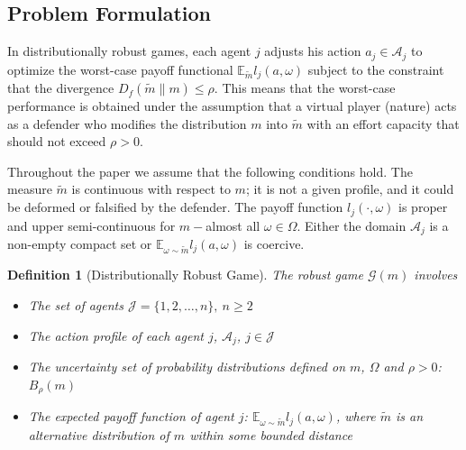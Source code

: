\documentclass{article}
\newtheorem{defi}{Definition}
\begin{document}
\subsection{Problem Formulation}
In distributionally robust games, each agent $j$ adjusts his action $a_j\in \mathcal{A}_j$ to optimize the worst-case payoff functional $\mathbb{E}_{\tilde{m}} l_j(a,\omega)$ subject to the constraint that the divergence $D_f(\tilde{m}\parallel m )\leq \rho$. This means that the worst-case performance is obtained under the assumption that a virtual player (nature) acts as a defender who modifies the distribution $m$ into $\tilde{m}$ with an effort capacity that should not exceed $\rho>0$. 

Throughout the paper we assume that the following conditions hold. The measure $\tilde{m}$ is continuous with respect to $m$; it is not a given profile, and it could be deformed or falsified by the defender. The payoff function $l_j(\cdot,\omega)$ is proper and upper semi-continuous for $m-$almost all $\omega\in\Omega$. Either the domain $\mathcal{A}_j$ is a non-empty compact set or $\mathbb{E}_{\omega \sim \tilde{m}} l_j(a,\omega)$ is coercive.

\begin{defi}[Distributionally Robust Game]
The robust game $\mathcal{G}(m)$ involves
\begin{itemize}
\item The set of agents $\mathcal{J}=\{1,2,\ldots, n\}, \ n\geq 2$
\item The action profile of each agent $j$, $\mathcal{A}_j$, $j\in \mathcal{J}$
\item The uncertainty set of probability distributions defined on $m$, $\Omega$ and $\rho>0$: $B_{\rho}(m)$
\item The expected payoff function of agent $j$: $\mathbb{E}_{\omega \sim \tilde{m}} l_j(a,\omega)$, where $\tilde{m}$ is an alternative distribution of $m$ within some bounded distance
\end{itemize}
\end{defi}
\end{document}
